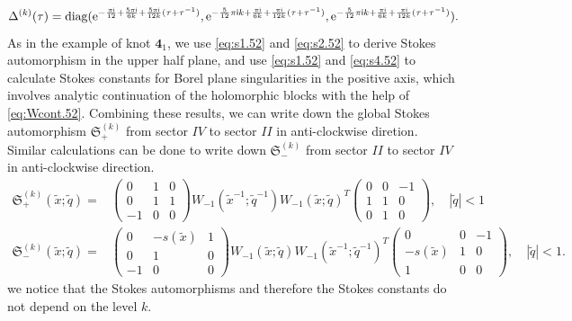 \documentclass[a4paper,11pt]{article}	%
\DeclareMathOperator{\diag}{diag}
\def\md{\mathbf}
\def\mf{\mathfrak}
\def\tq{\tilde{q}}
\def\tx{\tilde{x}}
\newcommand{\re}{{\rm e}}
\newcommand{\ri}{{\mathsf{i}}}
\newcommand{\knot}[1]{\md{#1}}
\begin{document}
\begin{equation}
  \Delta^{(k)}(\tau) =
  \diag(\re^{-\frac{\pi\ri}{12}+\frac{5\pi\ri}{6k}+\frac{5\pi\ri}{12k}(\tau+\tau^{-1})},
  \re^{-\frac{5}{12}\pi\ri k+\frac{\pi\ri}{6k}+\frac{\pi\ri}{12k}(\tau+\tau^{-1})},
  \re^{-\frac{5}{12}\pi\ri k+\frac{\pi\ri}{6k}+\frac{\pi\ri}{12k}(\tau+\tau^{-1})}
  ).
\end{equation}
As in the example of knot $\knot{4}_1$, we use \eqref{eq:s1.52} and
\eqref{eq:s2.52} to derive Stokes automorphism in the upper half
plane, and use \eqref{eq:s1.52} and \eqref{eq:s4.52} to calculate
Stokes constants for Borel plane singularities in the positive axis,
which involves analytic continuation of the holomorphic blocks with
the help of \eqref{eq:Wcont.52}.  Combining these results, we can
write down the global Stokes automorphism $\mf{S}_+^{(k)}$ from sector
$IV$ to sector $II$ in anti-clockwise diretion.  Similar calculations
can be done to write down $\mf{S}_-^{(k)}$ from sector $II$ to sector
$IV$ in anti-clockwise direction.
\begin{subequations}
\begin{align}
  \mf{S}_+^{(k)}(\tx;\tq) =
  &\begin{pmatrix}
    0&1&0\\
    0&1&1\\
    -1&0&0
  \end{pmatrix}W_{-1}(\tx^{-1};\tq^{-1})W_{-1}(\tx;\tq)^T
                    \begin{pmatrix}
                      0&0&-1\\
                      1&1&0\\
                      0&1&0
                    \end{pmatrix},\quad |\tq|<1\\
  \mf{S}_-^{(k)}(\tx;\tq) = &\begin{pmatrix}
    0&-s(\tx)&1\\
    0&1&0\\
    -1&0&0
  \end{pmatrix}W_{-1}(\tx;\tq) W_{-1}(\tx^{-1};\tq^{-1})^T
                \begin{pmatrix}
                  0&0&-1\\
                  -s(\tx)&1&0\\
                  1&0&0
                \end{pmatrix},\quad |\tq|<1.
\end{align}
\end{subequations}
we notice that the Stokes automorphisms and therefore
the Stokes constants do not depend on the level $k$.
\end{document}
